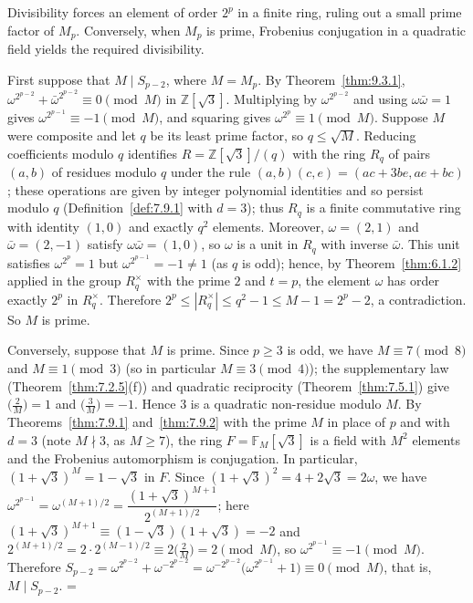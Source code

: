 \documentclass[11pt]{article}
\makeatletter
\theoremstyle{ntstyle}
\let\nt@closedisplay\]
\def\nt@guardedclose{\@ifnextchar\par{\nt@closeafterpar}{\@ifnextchar\end{\postdisplaypenalty\@M\nt@closedisplay}{\nt@closedisplay}}}
\def\nt@closeafterpar\par{\@ifnextchar\par{\nt@closeafterpar}{\@ifnextchar\end{\postdisplaypenalty\@M\nt@closedisplay\par}{\nt@closedisplay\par}}}
\renewenvironment{proof}[1][\proofname]{\par
  \pushQED{\qed}\normalfont\topsep\medskipamount\edef\nt@afterproof{\@endparpenalty=\the\@endparpenalty\relax}\@beginparpenalty\@M\@endparpenalty\@M\let\]\nt@guardedclose\trivlist\item[]\textit{#1\@addpunct{.}} \ignorespaces}{\ifvmode\addpenalty\@M\fi\popQED\nt@afterproof\endtrivlist\@endpefalse}
\newcommand{\legs}[2]{\bigl(\tfrac{#1}{#2}\bigr)}
\makeatother
\begin{document}
\begin{proof} Divisibility forces an element of order $2^p$ in a finite ring,
	ruling out a small prime factor of $M_p$. Conversely, when $M_p$ is prime,
	Frobenius conjugation in a quadratic field yields the required divisibility.

	First suppose that $M\mid S_{p-2}$, where $M=M_p$.
	By Theorem~\ref{thm:9.3.1},
	$\omega^{2^{p-2}}+\bar\omega^{2^{p-2}}\equiv0\pmod{M}$ in
	$\mathbb{Z}[\sqrt{3}]$. Multiplying by $\omega^{2^{p-2}}$ and using
	$\omega\bar\omega=1$ gives $\omega^{2^{p-1}}\equiv-1\pmod{M}$, and
	squaring gives $\omega^{2^{p}}\equiv1\pmod{M}$. Suppose $M$ were
	composite and let $q$ be its least prime factor, so $q\le\sqrt{M}$.
	Reducing coefficients modulo $q$ identifies
	$R=\mathbb{Z}[\sqrt{3}]/(q)$ with the ring $R_q$ of pairs $(a,b)$ of
	residues modulo $q$ under the rule $(a,b)(c,e)=(ac+3be,ae+bc)$; these
	operations are given by integer polynomial identities and so persist modulo $q$
	(Definition~\ref{def:7.9.1} with $d=3$); thus $R_q$ is a finite commutative
	ring with identity $(1,0)$ and exactly $q^{2}$ elements.
	Moreover, $\omega=(2,1)$ and $\bar\omega=(2,-1)$ satisfy
	$\omega\bar\omega=(1,0)$, so $\omega$ is a unit in $R_q$ with inverse $\bar\omega$. This
	unit satisfies $\omega^{2^{p}}=1$ but $\omega^{2^{p-1}}=-1\neq1$ (as
	$q$ is odd); hence, by Theorem~\ref{thm:6.1.2} applied in the group $R_q^{\times}$ with
	the prime $2$ and $t=p$, the element $\omega$ has order exactly $2^{p}$ in
	$R_q^{\times}$.
	Therefore $2^{p}\le|R_q^{\times}|\le q^2-1\le M-1=2^{p}-2$, a contradiction. So $M$ is prime.

	Conversely, suppose that $M$ is prime. Since
	$p\ge3$ is odd, we have $M\equiv7\pmod{8}$ and $M\equiv1\pmod{3}$
	(so in particular $M\equiv3\pmod{4}$); the supplementary law (Theorem~\ref{thm:7.2.5}(f)) and
	quadratic reciprocity (Theorem~\ref{thm:7.5.1})
	give $\legs{2}{M}=1$ and $\legs{3}{M}=-1$. Hence
	$3$ is a quadratic non-residue modulo $M$. By
	Theorems~\ref{thm:7.9.1} and~\ref{thm:7.9.2} with the prime $M$ in place of $p$ and with $d=3$
	(note $M\nmid3$, as $M\ge7$),
	the ring $F=\mathbb{F}_M[\sqrt{3}]$ is a field with $M^2$ elements and the
	Frobenius automorphism is conjugation. In particular,
	$(1+\sqrt{3})^{M}=1-\sqrt{3}$ in $F$. Since
	$(1+\sqrt{3})^2=4+2\sqrt{3}=2\omega$,
	we have $\omega^{2^{p-1}}=\omega^{(M+1)/2}=\dfrac{(1+\sqrt{3})^{M+1}}{2^{(M+1)/2}}$;
	here $(1+\sqrt{3})^{M+1}\equiv(1-\sqrt{3})(1+\sqrt{3})=-2$ and
	$2^{(M+1)/2}=2\cdot2^{(M-1)/2}\equiv2\legs{2}{M}=2\pmod{M}$,
	so $\omega^{2^{p-1}}\equiv-1\pmod{M}$. Therefore
	$S_{p-2}=\omega^{2^{p-2}}+\omega^{-2^{p-2}}=\omega^{-2^{p-2}}\big(\omega^{2^{p-1}}+1\big)\equiv0\pmod{M}$, that is, $M\mid S_{p-2}$.
\end{proof}
\end{document}
